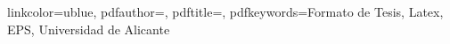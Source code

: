 \documentclass[paper=a4,10pt, Myfinal=true,twoside]{scrbook}
\begin{document}

\hypersetup
	{
 	linkcolor=ublue, %
	pdfauthor={\elautor},
	pdftitle={\eltitulo}, 
	pdfkeywords={Formato de Tesis, Latex, EPS, Universidad de Alicante}	
	 }

\frontmatter
{} %



% 


\cleardoublepage
{}
\pagestyle{especial}
\end{document}
